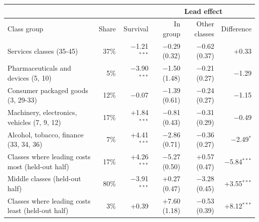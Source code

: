 {\small\begin{longtable}{>{\raggedright\arraybackslash}p{4.9cm}rrrrr}
\toprule & & & \multicolumn{3}{c}{Lead effect} \\ \cmidrule(l){4-6} Class group & Share & Survival & In group & Other classes & Difference \\ \midrule \endhead
Services classes (35-45) & 37\% & $-$1.21$^{***}$ & $-$0.29 (0.32) & $-$0.62 (0.37) & +0.33 \\
Pharmaceuticals and devices (5, 10) & 5\% & $-$3.90$^{***}$ & $-$1.50 (1.48) & $-$0.21 (0.27) & $-$1.29 \\
Consumer packaged goods (3, 29-33) & 12\% & $-$0.07 & $-$1.39 (0.61) & $-$0.24 (0.27) & $-$1.15 \\
Machinery, electronics, vehicles (7, 9, 12) & 17\% & +1.84$^{***}$ & $-$0.81 (0.43) & $-$0.31 (0.29) & $-$0.49 \\
Alcohol, tobacco, finance (33, 34, 36) & 7\% & +4.41$^{***}$ & $-$2.86 (0.71) & $-$0.36 (0.27) & $-$2.49$^{*}$ \\
Classes where leading costs most (held-out half) & 17\% & +4.26$^{***}$ & $-$5.27 (0.50) & +0.57 (0.47) & $-$5.84$^{***}$ \\
Middle classes (held-out half) & 80\% & $-$3.91$^{***}$ & +0.27 (0.47) & $-$3.28 (0.45) & +3.55$^{***}$ \\
Classes where leading costs least (held-out half) & 3\% & +0.39 & +7.60 (1.18) & $-$0.53 (0.39) & +8.12$^{***}$ \\
\bottomrule\end{longtable}}
